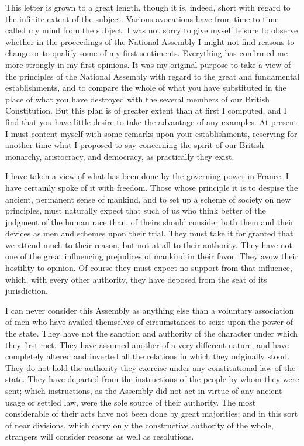 This letter is grown to a great length, though it is, indeed, short with regard to the infinite extent of the subject. Various avocations have from time to time called my mind from the subject. I was not sorry to give myself leisure to observe whether in the proceedings of the National Assembly I might not find reasons to change or to qualify some of my first sentiments. Everything has confirmed me more strongly in my first opinions. It was my original purpose to take a view of the principles of the National Assembly with regard to the great and fundamental establishments, and to compare the whole of what you have substituted in the place of what you have destroyed with the several members of our British Constitution. But this plan is of greater extent than at first I computed, and I find that you have little desire to take the advantage of any examples. At present I must content myself with some remarks upon your establishments, reserving for another time what I proposed to say concerning the spirit of our British monarchy, aristocracy, and democracy, as practically they exist.

I have taken a view of what has been done by the governing power in France. I have certainly spoke of it with freedom. Those whose principle it is to despise the ancient, permanent sense of mankind, and to set up a scheme of society on new principles, must naturally expect that such of us who think better of the judgment of the human race than, of theirs should consider both them and their devices as men and schemes upon their trial. They must take it for granted that we attend much to their reason, but not at all to their authority. They have not one of the great influencing prejudices of mankind in their favor. They avow their hostility to opinion. Of course they must expect no support from that influence, which, with every other authority, they have deposed from the seat of its jurisdiction.

I can never consider this Assembly as anything else than a voluntary association of men who have availed themselves of circumstances to seize upon the power of the state. They have not the sanction and authority of the character under which they first met. They have assumed another of a very different nature, and have completely altered and inverted all the relations in which they originally stood. They do not hold the authority they exercise under any constitutional law of the state. They have departed from the instructions of the people by whom they were sent; which instructions, as the Assembly did not act in virtue of any ancient usage or settled law, were the sole source of their authority. The most considerable of their acts have not been done by great majorities; and in this sort of near divisions, which carry only the constructive authority of the whole, strangers will consider reasons as well as resolutions.


